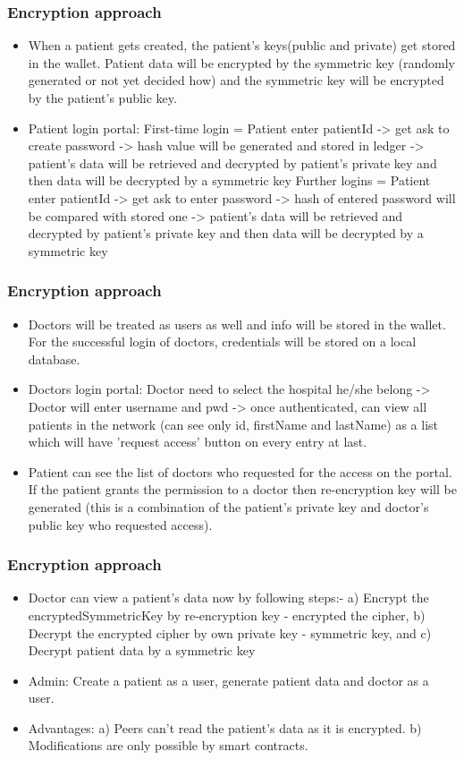 \documentclass[english,hangout]{beamer}
\begin{document}
\begin{frame}[fragile]
\frametitle{Encryption approach}
\begin{itemize}
    \item When a patient gets created, the patient's keys(public and private) get stored in the wallet. Patient data will be encrypted by the symmetric key (randomly generated or not yet decided how) and the symmetric key will be encrypted by the patient's public key.
    \item Patient login portal: 
    First-time login = Patient enter patientId -> get ask to create password -> hash value will be generated and stored in ledger -> patient's data will be retrieved and decrypted by patient's private key and then data will be decrypted by a symmetric key
    Further logins = Patient enter patientId -> get ask to enter password -> hash of entered password will be compared with stored one -> patient's data will be retrieved and decrypted by patient's private key and then data will be decrypted by a symmetric key
    
\end{itemize}
\end{frame}

\begin{frame}[fragile]
\frametitle{Encryption approach}
\begin{itemize}
    \item Doctors will be treated as users as well and info will be stored in the wallet. For the successful login of doctors, credentials will be stored on a local database.
    \item Doctors login portal: Doctor need to select the hospital he/she belong -> Doctor will enter username and pwd -> once authenticated, can view all patients in the network (can see only id, firstName and lastName) as a list which will have 'request access' button on every entry at last.
    \item Patient can see the list of doctors who requested for the access on the portal. If the patient grants the permission to a doctor then re-encryption key will be generated (this is a combination of the patient's private key and doctor's public key who requested access).
\end{itemize}
\end{frame}

\begin{frame}[fragile]
\frametitle{Encryption approach}
\begin{itemize}
    \item Doctor can view a patient's data now by following steps:-
    a) Encrypt the encryptedSymmetricKey by re-encryption key - encrypted the cipher,
    b) Decrypt the encrypted cipher by own private key - symmetric key, and 
    c) Decrypt patient data by a symmetric key
    \item Admin: Create a patient as a user, generate patient data and doctor as a user.
    \item Advantages:
    a) Peers can't read the patient's data as it is encrypted. 
    b) Modifications are only possible by smart contracts.
\end{itemize}
\end{frame}
\end{document}
